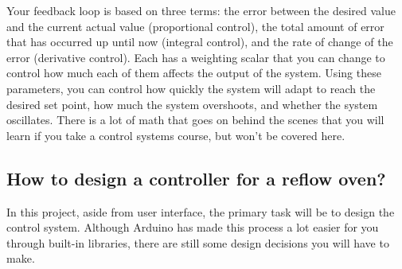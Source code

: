 \documentclass[10pt]{report}
\begin{document}
\par Your feedback loop is based on three terms: the error between the desired value and the current actual value (proportional control), the total amount of error that has occurred up until now (integral control), and the rate of change of the error (derivative control). Each has a weighting scalar that you can change to control how much each of them affects the output of the system. Using these parameters, you can control how quickly the system will adapt to reach the desired set point, how much the system overshoots, and whether the system oscillates. There is a lot of math that goes on behind the scenes that you will learn if you take a control systems course, but won't be covered here.

\subsection*{How to design a controller for a reflow oven?}

\par In this project, aside from user interface, the primary task will be to design the control system. Although Arduino has made this process a lot easier for you through built-in libraries, there are still some design decisions you will have to make.	
\end{document}
